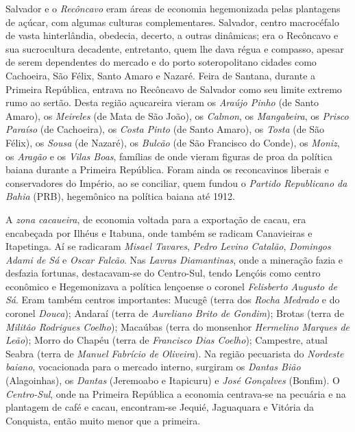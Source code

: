 Salvador e o \textit{Recôncavo} eram áreas de economia hegemonizada pelas plantagens de açúcar, com algumas culturas complementares. Salvador, centro macrocéfalo de vasta hinterlândia, obedecia, decerto, a outras dinâmicas; era o Recôncavo e sua sucrocultura decadente, entretanto, quem lhe dava régua e compasso, apesar de serem dependentes do mercado e do porto soteropolitano cidades como Cachoeira, São Félix, Santo Amaro e Nazaré. Feira de Santana, durante a Primeira República, entrava no Recôncavo de Salvador como seu limite extremo rumo ao sertão. Desta região açucareira vieram os \textit{Araújo Pinho} (de Santo Amaro), os \textit{Meireles} (de Mata de São João), os \textit{Calmon}, os \textit{Mangabeira}, os \textit{Prisco Paraíso} (de Cachoeira), os \textit{Costa Pinto} (de Santo Amaro), os \textit{Tosta} (de São Félix), os \textit{Sousa} (de Nazaré), os \textit{Bulcão} (de São Francisco do Conde), os \textit{Moniz}, os \textit{Aragão} e os \textit{Vilas Boas}, famílias de onde vieram figuras de proa da política baiana durante a Primeira República. Foram ainda os reconcavinos liberais e conservadores do Império, ao se conciliar, quem fundou o \textit{Partido Republicano da Bahia} (PRB), hegemônico na política baiana até 1912.

A \textit{zona cacaueira}, de economia voltada para a exportação de cacau, era encabeçada por Ilhéus e Itabuna, onde também se radicam Canavieiras e Itapetinga. Aí se radicaram \textit{Misael Tavares}, \textit{Pedro Levino Catalão}, \textit{Domingos Adami de Sá} e \textit{Oscar Falcão}. Nas \textit{Lavras Diamantinas}, onde a mineração fazia e desfazia fortunas, destacavam-se do Centro-Sul, tendo Lençóis como centro econômico e Hegemonizava a política lençoense o coronel \textit{Felisberto Augusto de Sá}. Eram também centros importantes: Mucugê (terra dos \textit{Rocha Medrado} e do coronel \textit{Douca}); Andaraí (terra de \textit{Aureliano Brito de Gondim}); Brotas (terra de \textit{Militâo Rodrigues Coelho}); Macaúbas (terra do monsenhor \textit{Hermelino Marques de Leão}); Morro do Chapéu (terra de \textit{Francisco Dias Coelho}); Campestre, atual Seabra (terra de \textit{Manuel Fabrício de Oliveira}). Na região pecuarista do \textit{Nordeste baiano}, vocacionada para o mercado interno,  surgiram os \textit{Dantas Bião} (Alagoinhas), os \textit{Dantas} (Jeremoabo e Itapicuru) e \textit{José Gonçalves} (Bonfim). O \textit{Centro-Sul}, onde na Primeira República a economia centrava-se na pecuária e na plantagem de café e cacau, encontram-se Jequié, Jaguaquara e Vitória da Conquista, então muito menor que a primeira. 

